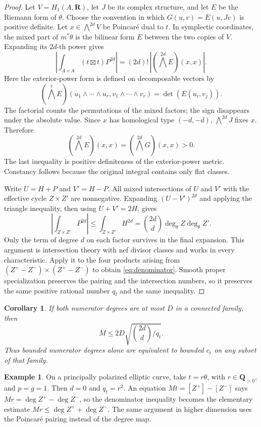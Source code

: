 \documentclass[11pt]{article}
\newtheorem{corollary}[theorem]{Corollary}
\theoremstyle{definition}
\newtheorem{example}[theorem]{Example}
\theoremstyle{remark}
\newcommand{\Q}{\mathbf Q}
\newcommand{\R}{\mathbf R}
\begin{document}
\begin{proof}
Let $V=H_1(A,\R)$, let $J$ be its complex structure, and let $E$ be the Riemann form of $\theta$. Choose the convention in which $G(u,v)=E(u,Jv)$ is positive definite. Let $x\in\bigwedge^{2d}V$ be Poincar\'e dual to $t$. In symplectic coordinates, the mixed part of $m^*\theta$ is the bilinear form $E$ between the two copies of $V$. Expanding its $2d$-th power gives
\[
 \left|\int_{A\times A}(t\boxtimes t)P^{2d}\right|
 =(2d)!\,\left|(\bigwedge^{2d}E)(x,x)\right|.
\]
Here the exterior-power form is defined on decomposable vectors by
\[
 (\bigwedge^r E)(u_1\wedge\cdots\wedge u_r,
 v_1\wedge\cdots\wedge v_r)=\det(E(u_i,v_j)).
\]
The factorial counts the permutations of the mixed factors; the sign disappears under the absolute value. Since $x$ has homological type $(-d,-d)$, $\bigwedge^{2d}J$ fixes $x$. Therefore
\[
 (\bigwedge^{2d}E)(x,x)
 =(\bigwedge^{2d}G)(x,x)>0.
\]
The last inequality is positive definiteness of the exterior-power metric. Constancy follows because the original integral contains only flat classes.

Write $U=H+P$ and $V'=H-P$. All mixed intersections of $U$ and $V'$ with the effective cycle $Z\times Z'$ are nonnegative. Expanding $(U-V')^{2d}$ and applying the triangle inequality, then using $U+V'=2H$, gives
\[
 \left|\int_{Z\times Z'}P^{2d}\right|
 \leq\int_{Z\times Z'}H^{2d}
 =\binom{2d}{d}\deg_\theta Z\deg_\theta Z'.
\]
Only the term of degree $d$ on each factor survives in the final expansion. This argument is intersection theory with nef divisor classes and works in every characteristic. Apply it to the four products arising from $(Z^+-Z^-)\times(Z^+-Z^-)$ to obtain \eqref{eq:denominator}. Smooth proper specialization preserves the pairing and the intersection numbers, so it preserves the same positive rational number $q_t$ and the same inequality.
\end{proof}

\begin{corollary}\label{cor:denominator}
If both numerator degrees are at most $D$ in a connected family, then
\[
 M\leq 2D\sqrt{\binom{2d}{d}/q_t}.
\]
Thus bounded numerator degrees alone are equivalent to bounded $c_t$ on any subset of that family.
\end{corollary}

\begin{example}\label{ex:elliptic-pairing}
On a principally polarized elliptic curve, take $t=r\theta$, with $r\in\Q_{>0}$, and $p=g=1$. Then $d=0$ and $q_t=r^2$. An equation $Mt=[Z^+]-[Z^-]$ says $Mr=\deg Z^+-\deg Z^-$, so the denominator inequality becomes the elementary estimate $Mr\leq\deg Z^++\deg Z^-$. The same argument in higher dimension uses the Poincar\'e pairing instead of the degree map.
\end{example}
\end{document}
